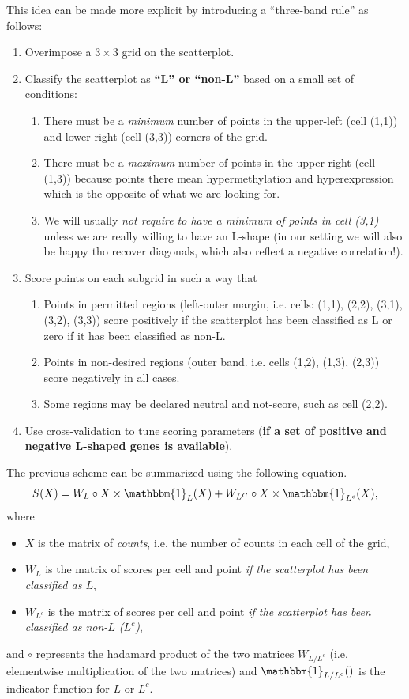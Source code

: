 \documentclass[a4paper,10pt]{article}\usepackage[]{graphicx}\usepackage[]{xcolor}
\begin{document}
This idea can be made more explicit by introducing a ``three-band rule'' as follows:
\begin{enumerate}
\item Overimpose a $3\times 3$ grid on the scatterplot.
\item Classify the scatterplot as \textbf{``L'' or ``non-L''} based on a small set of conditions:
\begin{enumerate}
  \item There must be a \emph{minimum} number of points in the upper-left (cell (1,1)) and lower right (cell (3,3)) corners of the grid.
  \item There must be a \emph{maximum} number of points in the upper right (cell (1,3)) because points there mean hypermethylation and hyperexpression which is the opposite of what we are looking for.
  \item We will usually \emph{not require to have a minimum of points in cell (3,1)} unless we are really willing to have an L-shape (in our setting we will also be happy tho recover diagonals, which also reflect a negative correlation!).
\end{enumerate}

\item Score points on each subgrid in such a way that
\begin{enumerate}
	\item Points in permitted regions (left-outer margin, i.e. cells: (1,1), (2,2), (3,1), (3,2), (3,3)) score positively if the scatterplot has been classified as L or zero if it has been classified as non-L.
	\item Points in non-desired regions (outer band. i.e. cells (1,2), (1,3), (2,3)) score negatively in all cases.
	\item Some regions may be declared neutral and not-score, such as cell (2,2).
\end{enumerate}
\item Use cross-validation to tune scoring parameters (\textbf{if a set of positive and negative L-shaped genes is available}).
\end{enumerate}

The previous scheme can be summarized using the following equation.
\begin{equation}
S(X) = W_L \circ X \times \mathbbm{1}_L(X) + W_{L^C} \circ X \times \mathbbm{1}_{L^c}(X),
\end{equation}
where
\begin{itemize}
\item ${X}$ is the matrix of \emph{counts}, i.e. the number of counts in each cell of the grid,
\item ${W_L}$ is the matrix of scores per cell and point \emph{if the scatterplot has been classified as $L$},
\item ${W_{L^c}}$ is the matrix of scores per cell and point \emph{if the scatterplot has been classified as non-$L$ ($L^c$)},
\end{itemize}
and $\circ$ represents the hadamard product of the two matrices $W_{L/L^c}$ (i.e. elementwise multiplication of the two matrices) and $\mathbbm{1}_{L/L^c}()$ is the indicator function for $L$ or $L^c$.
\end{document}
